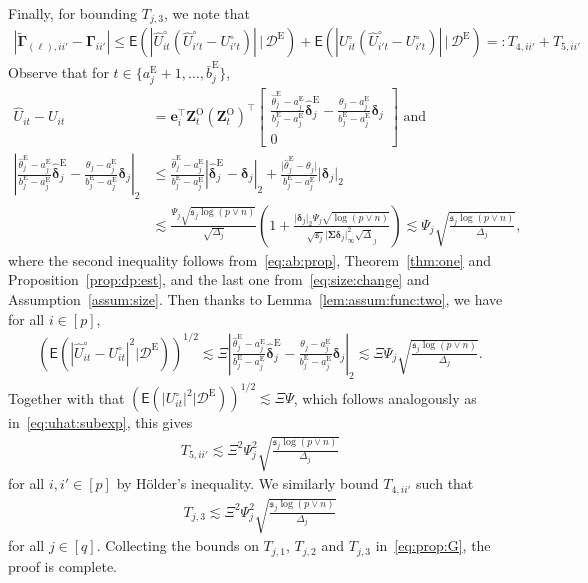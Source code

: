 \documentclass[11pt, a4paper]{article}
\newcommand{\mbf}{\mathbf}
\newcommand{\mc}{\mathcal}
\newcommand{\bmx}{\begin{bmatrix}}
\newcommand{\emx}{\end{bmatrix}}
\renewcommand{\l}{\left}
\renewcommand{\r}{\right}
\def\wh{\widehat}
\def\wt{\widetilde}
\newcommand{\cp}{\theta}
\newcommand{\E}[0]{\mathsf{E}}
\newcommand{\tE}{\text{E}}
\newcommand{\tO}{\text{O}}
\theoremstyle{definition}
\theoremstyle{definition}
\theoremstyle{definition}
\theoremstyle{definition}
\theoremstyle{definition}
\theoremstyle{remark}
\theoremstyle{definition}
\theoremstyle{definition}
\theoremstyle{definition}
\begin{document}
Finally, for bounding $T_{j, 3}$, we note that 
\begin{align*}
\l\vert \wt{\bm\Gamma}_{(\ell), ii'} - \bm\Gamma_{ii'} \r\vert
\le \E\l( \l\vert \wh{U}^\circ_{it}\l( \wh{U}^\circ_{i't} - U^\circ_{i't} \r) \r\vert \,\big\vert\, \mc D^{\tE} \r) + \E\l( \l\vert U^\circ_{it}\l( \wh{U}^\circ_{i't} - U^\circ_{i't} \r) \r\vert \,\big\vert\, \mc D^{\tE} \r)  =: T_{4, ii'} + T_{5, ii'}
\end{align*}
Observe that for $t \in \{a^{\tE}_j + 1, \ldots, \bar{b}^{\tE}_j\}$, 
\begin{align*}
\wh{U}_{it} - U_{it} &= \mbf e_i^\top \mbf Z_t^{\tO} (\mbf Z_t^{\tO})^\top 
\bmx
\frac{\wh\cp^{\tE}_j - a^{\tE}_j}{b^{\tE}_j - a^{\tE}_j} \wh{\bm\delta}^{\tE}_j - \frac{\cp_j - a^{\tE}_j}{b^{\tE}_j - a^{\tE}_j} \bm\delta_j \\ 0
\emx \text{ \ and}
\\
\l\vert \frac{\wh\cp^{\tE}_j - a^{\tE}_j}{b^{\tE}_j - a^{\tE}_j} \wh{\bm\delta}^{\tE}_j - \frac{\cp_j - a^{\tE}_j}{b^{\tE}_j - a^{\tE}_j} \bm\delta_j \r\vert_2 
&\le \frac{\wh\cp^{\tE}_j - a^{\tE}_j}{b^{\tE}_j - a^{\tE}_j} \l\vert \wh{\bm\delta}^{\tE}_j - \bm\delta_j \r\vert_2 + \frac{\vert \wh\cp^{\tE}_j - \cp_j \vert }{b^{\tE}_j - a^{\tE}_j} \vert \bm\delta_j \vert_2
\\
&\lesssim \frac{\Psi_j \sqrt{\mathfrak{s}_j \log(p \vee n)}}{\sqrt{\Delta_j}} \l(1 + \frac{\vert \bm\delta_j \vert_2 \Psi_j \sqrt{\log(p \vee n)}}{\sqrt{\mathfrak{s}_j} \vert \bm\Sigma \bm\delta_j \vert_\infty^2 \sqrt{\Delta}_j} \r)
\lesssim \Psi_j \sqrt{\frac{\mathfrak{s}_j \log(p \vee n)}{\Delta_j}},
\end{align*}
where the second inequality follows 
from~\eqref{eq:ab:prop}, Theorem~\ref{thm:one} and Proposition~\ref{prop:dp:est}, and the last one from~\eqref{eq:size:change} and Assumption~\ref{assum:size}.
Then thanks to Lemma~\ref{lem:assum:func:two}, we have for all $i \in [p]$, 
\begin{align*}
\l(\E\l( \l\vert \wh{U}^\circ_{it} - U^\circ_{it} \r\vert^2 \bigg \vert \mc D^{\tE} \r)\r)^{1/2} \lesssim \Xi \l\vert \frac{\wh\cp^{\tE}_j - a^{\tE}_j}{b^{\tE}_j - a^{\tE}_j} \wh{\bm\delta}^{\tE}_j - \frac{\cp_j - a^{\tE}_j}{b^{\tE}_j - a^{\tE}_j} \bm\delta_j \r\vert_2 \lesssim \Xi \Psi_j \sqrt{\frac{\mathfrak{s}_j \log(p \vee n)}{\Delta_j}}.
\end{align*}
Together with that $(\E( \vert U^\circ_{it} \vert^2 \vert \mc D^{\tE}))^{1/2} \lesssim \Xi \Psi$, which follows analogously as in~\eqref{eq:uhat:subexp}, this gives 
\begin{align*}
T_{5, ii'} \lesssim \Xi^2 \Psi_j^2 \sqrt{\frac{\mathfrak{s}_j \log(p \vee n)}{\Delta_j}}
\end{align*}
for all $i, i' \in [p]$ by H\"{o}lder's inequality. 
We similarly bound $T_{4, ii'}$ such that
\begin{align*}
T_{j, 3} \lesssim \Xi^2 \Psi_j^2 \sqrt{\frac{\mathfrak{s}_j \log(p \vee n)}{\Delta_j}}
\end{align*}
for all $j \in [q]$.
Collecting the bounds on $T_{j, 1}$, $T_{j, 2}$ and $T_{j, 3}$ in~\eqref{eq:prop:G}, the proof is complete.
\end{document}
